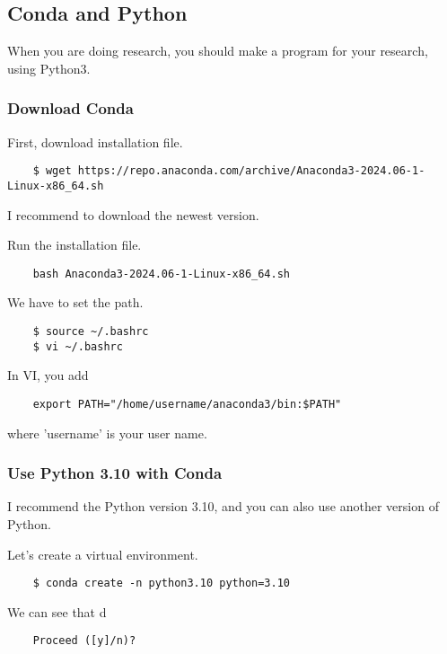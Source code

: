 \subsection{Conda and Python}

When you are doing research, you should make a program for your research, using Python3.

\subsubsection{Download Conda}

First, download installation file.

\begin{verbatim}
    $ wget https://repo.anaconda.com/archive/Anaconda3-2024.06-1-Linux-x86_64.sh
\end{verbatim}

I recommend to download the newest version.

Run the installation file.

\begin{verbatim}
    bash Anaconda3-2024.06-1-Linux-x86_64.sh
\end{verbatim}

We have to set the path.

\begin{verbatim}
    $ source ~/.bashrc
    $ vi ~/.bashrc
\end{verbatim}

In VI, you add

\begin{verbatim}
    export PATH="/home/username/anaconda3/bin:$PATH"
\end{verbatim}

where 'username' is your user name.

\subsubsection{Use Python 3.10 with Conda}

I recommend the Python version 3.10, and you can also use another version of Python.

Let's create a virtual environment.

\begin{verbatim}
    $ conda create -n python3.10 python=3.10
\end{verbatim}

We can see that
d
\begin{verbatim}
    Proceed ([y]/n)?
\end{verbatim}

